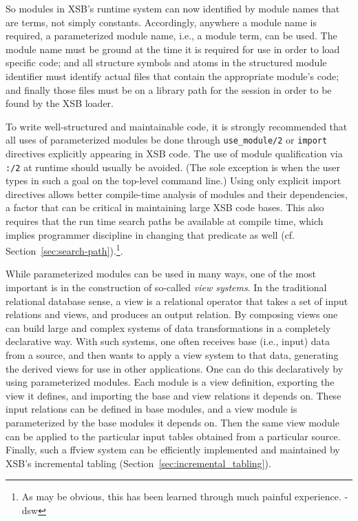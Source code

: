 So modules in XSB's runtime system can now identified by module names
that are terms, not simply constants. Accordingly, anywhere a module
name is required, a parameterized module name, i.e., a module term,
can be used.  The module name must be ground at the time it is
required for use in order to load specific code; and all structure
symbols and atoms in the structured module identifier must identify
actual files that contain the appropriate module's code; and finally
those files must be on a library path for the session in order to be
found by the XSB loader.

To write well-structured and maintainable code, it is strongly
recommended that all uses of parameterized modules be done through
{\tt use\_module/2} or {\tt import} directives explicitly appearing in
XSB code.  The use of module qualification via {\tt :/2} at runtime
should usually be avoided.  (The sole exception is when the user types
in such a goal on the top-level command line.)  Using only explicit
import directives allows better compile-time analysis of modules and
their dependencies, a factor that can be critical in maintaining large
XSB code bases. This also requires that the run time search paths be
available at compile time, which implies programmer discipline in
changing that predicate as well
(cf. Section~\ref{sec:search-path}).\footnote{As may be obvious, this
  has been learned through much painful experience. -dsw}.

While parameterized modules can be used in many ways, one of the most
important is in the construction of so-called {\em view systems}.  In
the traditional relational database sense, a view is a relational
operator that takes a set of input relations and views, and produces
an output relation.  By composing views one can build large and
complex systems of data transformations in a completely declarative
way.  With such systems, one often receives base (i.e., input) data
from a source, and then wants to apply a view system to that data,
generating the derived views for use in other applications.  One can
do this declaratively by using parameterized modules.  Each module is
a view definition, exporting the view it defines, and importing the
base and view relations it depends on.  These input relations can be
defined in base modules, and a view module is parameterized by the
base modules it depends on.  Then the same view module can be applied
to the particular input tables obtained from a particular source.
Finally, such a ffview system can be efficiently implemented and
maintained by XSB's incremental tabling
(Section~\ref{sec:incremental_tabling}).


